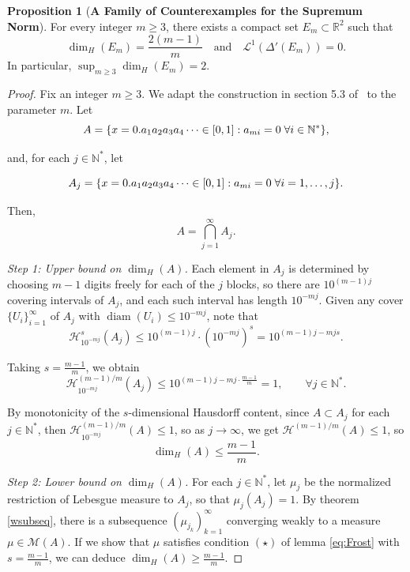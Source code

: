 \documentclass[12pt,a4paper]{report}
\theoremstyle{definition}
\newtheorem{proposition}{Proposition}
\begin{document}
\begin{proposition}[\textbf{A Family of Counterexamples for the Supremum Norm}] \label{counterexSup}
For every integer $m \geq 3$, there exists a compact set $E_m \subset \mathbb{R}^2$ such that
\[
\dim_H(E_m) = \frac{2(m-1)}{m} \quad \text{and} \quad \mathcal{L}^1(\Delta'(E_m)) = 0.
\]
In particular, $\sup_{m \geq 3} \dim_H(E_m) = 2$.
\end{proposition}

\begin{proof} Fix an integer $m \geq 3$. We adapt the construction in section 5.3 of~\cite{falconer1985geometry} to the parameter $m$.
Let
$$ A = \{ x= 0.a_1a_2a_3a_4\cdots \in [0,1] : a_{mi} = 0 \hspace{0.1 cm} \forall i \in \mathbb{N^*} \},$$

and, for each $j \in \mathbb{N}^*$, let

$$ A_j = \{ x= 0.a_1a_2a_3a_4\cdots \in [0,1] : a_{mi} = 0 \hspace{0.1 cm} \forall i = 1, \dots, j  \}.$$

Then,
\[
A = \bigcap_{j=1}^\infty A_j.
\]

\noindent
\textit{Step 1: Upper bound on $\dim_H(A)$.}
Each element in \( A_j \) is determined by choosing $m-1$ digits freely for each of the \( j \) blocks, so there are $10^{(m-1)j}$ covering intervals of $A_j$, and each such interval has length $10^{-mj}$. Given any cover \( \{U_i\}_{i=1}^{\infty} \) of \( A_j \) with \( \operatorname{diam}(U_i) \leq 10^{-mj} \), note that
\[
\mathcal{H}^s_{10^{-mj}}(A_j) \leq 10^{(m-1)j} \cdot (10^{-mj})^s = 10^{(m-1)j - mjs}.
\]

Taking \( s = \frac{m-1}{m} \), we obtain
\[
\mathcal{H}^{(m-1)/m}_{10^{-mj}}(A_j) \leq 10^{(m-1)j - mj \cdot \frac{m-1}{m}} = 1, \qquad \forall j\in \mathbb{N^*}.
\]

By monotonicity of the $s$-dimensional Hausdorff content, since $A \subset A_j$ for each $j\in \mathbb{N^*}$, then $\mathcal{H}^{(m-1)/m}_{10^{-mj}}(A) \leq 1$, so as \( j \to \infty \), we get $ \mathcal{H}^{(m-1)/m}(A) \leq 1$, so
\[
\dim_H(A) \leq \frac{m-1}{m}.
\]

\noindent
\textit{Step 2: Lower bound on $\dim_H(A)$.}
For each \( j \in \mathbb{N}^*\), let \(\mu_j\) be the normalized restriction of Lebesgue measure to \(A_j\), so that \(\mu_j(A_j) = 1\). By theorem \ref{wsubseq}, there is a subsequence $ (\mu_{j_{k}})_{k=1}^{\infty} $ converging weakly to a measure \(\mu \in \mathcal{M}(A)\). If we show that \(\mu\) satisfies condition $(\star)$ of lemma \ref{eq:Frost} with \(s = \frac{m-1}{m}\), we can deduce  \(\dim_H(A) \geq \frac{m-1}{m}\).


\end{proof}
\end{document}
